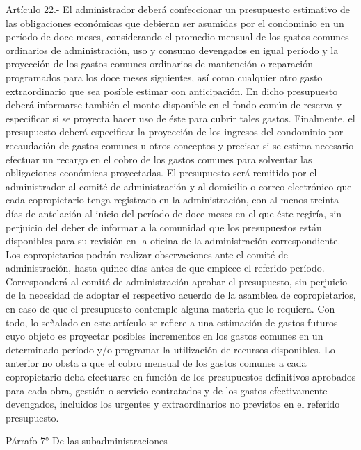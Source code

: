     Artículo 22.- El administrador deberá confeccionar un presupuesto estimativo de las obligaciones económicas que debieran ser asumidas por el condominio en un período de doce meses, considerando el promedio mensual de los gastos comunes ordinarios de administración, uso y consumo devengados en igual período y la proyección de los gastos comunes ordinarios de mantención o reparación programados para los doce meses siguientes, así como cualquier otro gasto extraordinario que sea posible estimar con anticipación. En dicho presupuesto deberá informarse también el monto disponible en el fondo común de reserva y especificar si se proyecta hacer uso de éste para cubrir tales gastos. Finalmente, el presupuesto deberá especificar la proyección de los ingresos del condominio por recaudación de gastos comunes u otros conceptos y precisar si se estima necesario efectuar un recargo en el cobro de los gastos comunes para solventar las obligaciones económicas proyectadas.
    El presupuesto será remitido por el administrador al comité de administración y al domicilio o correo electrónico que cada copropietario tenga registrado en la administración, con al menos treinta días de antelación al inicio del período de doce meses en el que éste regiría, sin perjuicio del deber de informar a la comunidad que los presupuestos están disponibles para su revisión en la oficina de la administración correspondiente. Los copropietarios podrán realizar observaciones ante el comité de administración, hasta quince días antes de que empiece el referido período.
    Corresponderá al comité de administración aprobar el presupuesto, sin perjuicio de la necesidad de adoptar el respectivo acuerdo de la asamblea de copropietarios, en caso de que el presupuesto contemple alguna materia que lo requiera.
    Con todo, lo señalado en este artículo se refiere a una estimación de gastos futuros cuyo objeto es proyectar posibles incrementos en los gastos comunes en un determinado período y/o programar la utilización de recursos disponibles. Lo anterior no obsta a que el cobro mensual de los gastos comunes a cada copropietario deba efectuarse en función de los presupuestos definitivos aprobados para cada obra, gestión o servicio contratados y de los gastos efectivamente devengados, incluidos los urgentes y extraordinarios no previstos en el referido presupuesto.
     
    Párrafo 7°
    De las subadministraciones

